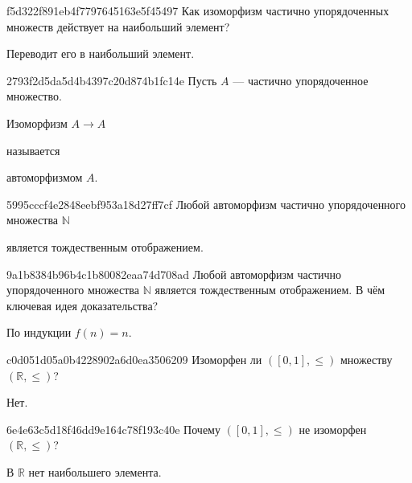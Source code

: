 \begin{note}{f5d322f891eb4f7797645163e5f45497}
    Как изоморфизм частично упорядоченных множеств действует на наибольший элемент?

    \begin{cloze}{1}
        Переводит его в наибольший элемент.
    \end{cloze}
\end{note}

\begin{note}{2793f2d5da5d4b4397c20d874b1fc14e}
    Пусть \({ A }\) --- частично упорядоченное множество.
    \begin{icloze}{2}Изоморфизм \({ A \to A }\)\end{icloze} называется \begin{icloze}{1}автоморфизмом \({ A }\).\end{icloze}
\end{note}

\begin{note}{5995cccf4e2848eebf953a18d27ff7cf}
    Любой автоморфизм частично упорядоченного множества \({ \mathbb N }\) \begin{icloze}{1}является тождественным отображением.\end{icloze}
\end{note}

\begin{note}{9a1b8384b96b4c1b80082eaa74d708ad}
    Любой автоморфизм частично упорядоченного множества \({ \mathbb N }\) является тождественным отображением.
    В чём ключевая идея доказательства?

    \begin{cloze}{1}
        По индукции \({ f(n) = n }\).
    \end{cloze}
\end{note}

\begin{note}{c0d051d05a0b4228902a6d0ea3506209}
    Изоморфен ли \({ ([0, 1], \leqslant) }\) множеству \({ (\mathbb R, \leqslant) }\)?

    \begin{cloze}{1}
        Нет.
    \end{cloze}
\end{note}

\begin{note}{6e4e63c5d18f46dd9e164c78f193c40e}
    Почему \({ ([0, 1], \leqslant) }\) не изоморфен \({ (\mathbb R, \leqslant) }\)?

    \begin{cloze}{1}
        В \({ \mathbb R }\) нет наибольшего элемента.
    \end{cloze}
\end{note}

